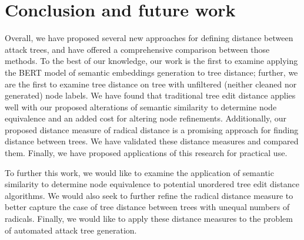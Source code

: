 \section{Conclusion and future work}
\label{sec:conclusion}

Overall, we have proposed several new approaches for defining distance between attack trees, and have offered a comprehensive comparison between those methods. To the best of our knowledge, our work is the first to examine applying the BERT model of semantic embeddings generation to tree distance; further, we are the first to examine tree distance on tree with unfiltered (neither cleaned nor generated) node labels. We have found that traditional tree edit distance applies well with our proposed alterations of semantic similarity to determine node equivalence and an added cost for altering node refinements. Additionally, our proposed distance measure of radical distance is a promising approach for finding distance between trees. We have validated these distance measures and compared them. Finally, we have proposed applications of this research for practical use.

To further this work, we would like to examine the application of semantic similarity to determine node equivalence to potential unordered tree edit distance algorithms. We would also seek to further refine the radical distance measure to better capture the case of tree distance between trees with unequal numbers of radicals. Finally, we would like to apply these distance measures to the problem of automated attack tree generation.